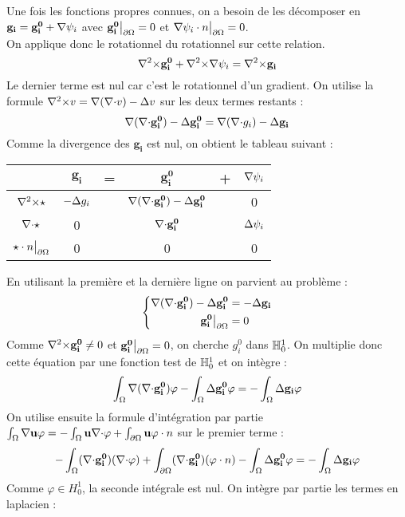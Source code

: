 Une fois les fonctions propres connues, on a besoin de les décomposer en $\mathbf{g_i}=\mathbf{g_i^0}+{\nabla}\psi_i$ avec $\mathbf{g_i^0}{\big\rvert_{\partial\Omega}} = 0$ et ${\nabla}\psi_i\cdot n{\big\rvert_{\partial\Omega}} = 0$.\\
On applique donc le rotationnel du rotationnel sur cette relation.\\
\[
{\nabla^2\times} \mathbf{g_i^0} +{\nabla^2\times}{\nabla}\psi_i = {\nabla^2\times} \mathbf{g_i}
\]
Le dernier terme est nul car c'est le rotationnel d'un gradient. On utilise la formule ${\nabla^2\times} v={\nabla}({\nabla\cdot} v)-{\Delta} v$ sur les deux termes restants :
\[
{\nabla}({\nabla\cdot} \mathbf{g_i^0})-{\Delta} \mathbf{g_i^0} = {\nabla}({\nabla\cdot} g_i)-{\Delta} \mathbf{g_i}
\]
Comme la divergence des $\mathbf{g_i}$ est nul, on obtient le tableau suivant :
\begin{center}
\begin{tabular}{c|ccccc}
& $\mathbf{g_i}$ & = & $\mathbf{g_i^0}$ & + & ${\nabla}\psi_i$ \\ \hline
${\nabla^2\times}\star$ & $-{\Delta} g_i$ & & ${\nabla}({\nabla\cdot} \mathbf{g_i^0})-{\Delta} \mathbf{g_i^0}$ & & 0\\ \hline
${\nabla\cdot}\star$ & 0 & & ${\nabla\cdot} \mathbf{g_i^0}$ & & ${\Delta}\psi_i$\\ \hline
$\star\cdot n{\big\rvert_{\partial\Omega}}$ & 0 & & 0 & & 0
\end{tabular}
\end{center}
En utilisant la première et la dernière ligne on parvient au problème :
\begin{equation}
\label{gi0}
\left\{
\begin{aligned}
{\nabla}({\nabla\cdot} \mathbf{g_i^0})-{\Delta} \mathbf{g_i^0} &= -{\Delta} \mathbf{g_i}\\
\mathbf{g_i^0}{\big\rvert_{\partial\Omega}} &= 0
\end{aligned}
\right.
\end{equation}
Comme ${\nabla^2\times}\mathbf{g_i^0}\not=0$ et $\mathbf{g_i^0}{\big\rvert_{\partial\Omega}}=0$, on cherche $g_i^0$ dans ${\mathbb{H}}^1_0$. On multiplie donc cette équation par une fonction test de ${\mathbb{H}}^1_0$ et on intègre :
\[
\int_\Omega {\nabla}({\nabla\cdot} \mathbf{g_i^0})\varphi - \int_\Omega {\Delta} \mathbf{g_i^0}\varphi = -\int_\Omega {\Delta} \mathbf{g_i}\varphi
\]
On utilise ensuite la formule d'intégration par partie $\int_\Omega {\nabla}{\mathbf{u}}\varphi = -\int_\Omega \mathbf{u}{\nabla\cdot}\varphi + \int_{\partial\Omega} \mathbf{u}\varphi\cdot n$ sur le premier terme :
\[
-\int_\Omega ({\nabla\cdot} \mathbf{g_i^0})({\nabla\cdot}\varphi) + \int_{\partial\Omega} ({\nabla\cdot} \mathbf{g_i^0})(\varphi\cdot n) - \int_\Omega {\Delta} \mathbf{g_i^0}\varphi = -\int_\Omega {\Delta} \mathbf{g_i}\varphi
\]
Comme $\varphi\in H^1_0$, la seconde intégrale est nul. On intègre par partie les termes en laplacien :
